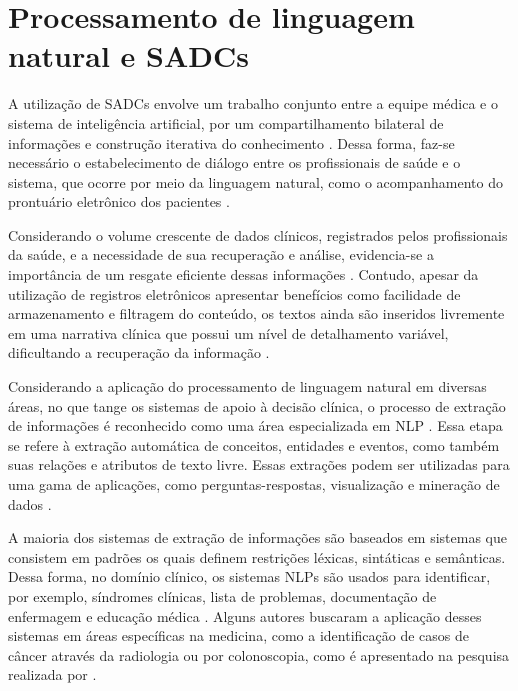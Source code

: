 \documentclass[12pt]{article}
\begin{document}
\section{Processamento de linguagem natural e SADCs}

A utilização de SADCs envolve um trabalho conjunto entre a equipe médica e o sistema de inteligência artificial, por um compartilhamento bilateral de informações e construção iterativa do conhecimento \cite{artigo_base}. Dessa forma, faz-se necessário o estabelecimento de diálogo entre os profissionais de saúde e o sistema, que ocorre por meio da linguagem natural, como o acompanhamento do prontuário eletrônico dos pacientes \cite{lichtenstein2011sistemas}.

Considerando o volume crescente de dados clínicos, registrados pelos profissionais da saúde, e a necessidade de sua recuperação e análise, evidencia-se a importância de um resgate eficiente dessas informações \cite{prontuario_PLN}. Contudo, apesar da utilização de registros eletrônicos apresentar benefícios como facilidade de armazenamento e filtragem do conteúdo, os textos ainda são inseridos livremente em uma narrativa clínica que possui um nível de detalhamento variável, dificultando a recuperação da informação \cite{prontuario_PLN}.

Considerando a aplicação do processamento de linguagem natural em diversas áreas, no que tange os sistemas de apoio à decisão clínica, o processo de extração de informações é reconhecido como uma área especializada em NLP \cite{WANG201834}. Essa etapa se refere à extração automática de conceitos, entidades e eventos, como também suas relações e atributos de texto livre. Essas extrações podem ser utilizadas para uma gama de aplicações, como perguntas-respostas, visualização e mineração de dados \cite{liddy2001natural}.

A maioria dos sistemas de extração de informações são baseados em sistemas que consistem em padrões os quais definem restrições léxicas, sintáticas e semânticas. Dessa forma, no domínio clínico, os sistemas NLPs são usados para identificar, por exemplo, síndromes clínicas, lista de problemas, documentação de enfermagem e educação médica \cite{WANG201834}. Alguns autores buscaram a aplicação desses sistemas em áreas específicas na medicina, como a identificação de casos de câncer através da radiologia ou por colonoscopia, como é apresentado na pesquisa realizada por \cite{algorithm_cdss}. 
\end{document}
